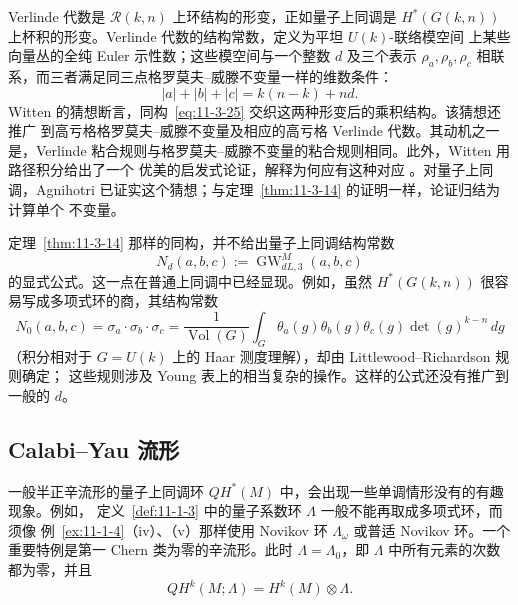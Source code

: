 Verlinde 代数是 $\mathcal R(k,n)$ 上环结构的形变，正如量子上同调是
$H^*(G(k,n))$ 上杯积的形变。Verlinde 代数的结构常数，定义为平坦 $U(k)$-联络模空间
上某些向量丛的全纯 Euler 示性数；这些模空间与一个整数 $d$ 及三个表示
$\rho_a,\rho_b,\rho_c$ 相联系，而三者满足同三点格罗莫夫--威滕不变量一样的维数条件：
\[
  |a|+|b|+|c|=k(n-k)+nd.
\]
Witten 的猜想断言，同构~\eqref{eq:11-3-25} 交织这两种形变后的乘积结构。该猜想还推广
到高亏格格罗莫夫--威滕不变量及相应的高亏格 Verlinde 代数。其动机之一是，Verlinde
粘合规则与格罗莫夫--威滕不变量的粘合规则相同。此外，Witten 用路径积分给出了一个
优美的启发式论证，解释为何应有这种对应 。对量子上同调，Agnihotri
 已证实这个猜想；与定理~\ref{thm:11-3-14} 的证明一样，论证归结为计算单个
不变量。

\begin{remark}[结构常数]\label{rem:11-3-20}
定理~\ref{thm:11-3-14} 那样的同构，并不给出量子上同调结构常数
\[
  N_d(a,b,c):=\operatorname{GW}_{dL,3}^M(a,b,c)
\]
的显式公式。这一点在普通上同调中已经显现。例如，虽然
$H^*(G(k,n))$ 很容易写成多项式环的商，其结构常数
\[
  N_0(a,b,c)=\sigma_a\cdot\sigma_b\cdot\sigma_c
  =\frac1{\operatorname{Vol}(G)}
  \int_G\theta_a(g)\theta_b(g)\theta_c(g)\det(g)^{k-n}\,dg
\]
（积分相对于 $G=U(k)$ 上的 Haar 测度理解），却由 Littlewood--Richardson 规则确定；
这些规则涉及 Young 表上的相当复杂的操作。这样的公式还没有推广到一般的 $d$。
\end{remark}

\subsection{Calabi--Yau 流形}\label{subsec:11-3-4}

一般半正辛流形的量子上同调环 $QH^*(M)$ 中，会出现一些单调情形没有的有趣现象。例如，
定义~\ref{def:11-1-3} 中的量子系数环 $\Lambda$ 一般不能再取成多项式环，而须像
例~\ref{ex:11-1-4}（iv）、（v）那样使用 Novikov 环 $\Lambda_\omega$ 或普适 Novikov
环。一个重要特例是第一 Chern 类为零的辛流形。此时
$\Lambda=\Lambda_0$，即 $\Lambda$ 中所有元素的次数都为零，并且
\[
  QH^k(M;\Lambda)=H^k(M)\otimes\Lambda.
\]


